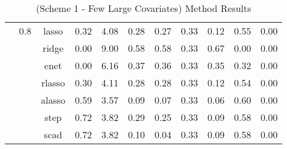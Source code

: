 \begin{table}[H]
{\begin{tabular}{c c c|c|c|c c|c c c c}
        \cline{2-11}
        &0.8 &lasso &0.32 &4.08 &0.28 &0.27 &0.33 &0.12 &0.55 &0.00\\
        & &ridge &0.00 &9.00 &0.58 &0.58 &0.33 &0.67 &0.00&0.00\\
        & &enet &0.00&6.16 &0.37 &0.36 &0.33 &0.35 &0.32 &0.00\\
        & &rlasso &0.30&4.11 &0.28 &0.28 &0.33 &0.12 &0.54 &0.00\\
        & &alasso &0.59 &3.57 &0.09 &0.07 &0.33 &0.06 &0.60 &0.00\\
        & &step &0.72 &3.82 &0.29 &0.25 &0.33 &0.09 &0.58 &0.00\\
        & &scad &0.72 &3.82 &0.10&0.04 &0.33 &0.09 &0.58 &0.00\\
        \hline
    \end{tabular}
    }
    \caption{(Scheme 1 - Few Large Covariates) Method Results}
    \label{tbl:scheme-1-results}
\end{table}

